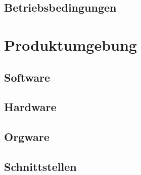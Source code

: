\documentclass[a4paper,10pt]{article}
\begin{document}
\subsection{Betriebsbedingungen}
\section{Produktumgebung}
\subsection{Software}
\subsection{Hardware}
\subsection{Orgware}
\subsection{Schnittstellen}
\end{document}

